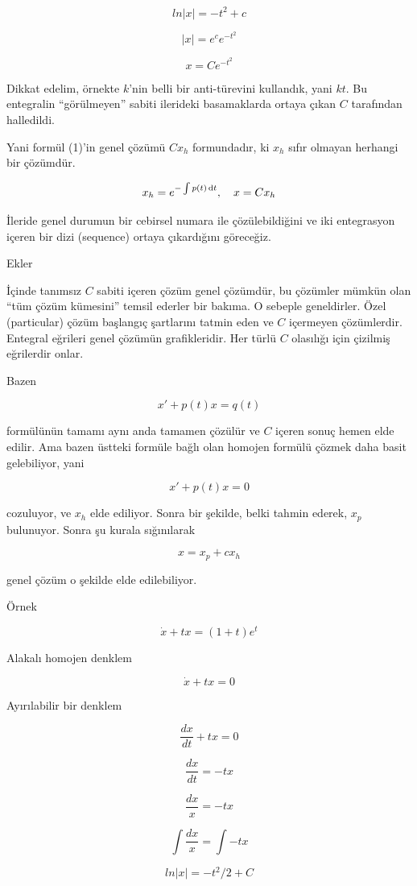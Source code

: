 \documentclass[12pt,fleqn]{article}\usepackage{../../common}
\begin{document}
$$ ln|x| = - t^2 + c $$

$$ |x| = e^c e^{-t^2} $$

$$ x = C e^{-t^2} $$

Dikkat edelim, örnekte $k$'nin belli bir anti-türevini kullandık, yani
$kt$. Bu entegralin ``görülmeyen'' sabiti ilerideki basamaklarda ortaya
çıkan $C$ tarafından halledildi.

Yani formül (1)'in genel çözümü $C x_h$ formundadır, ki $x_h$ sıfır olmayan
herhangi bir çözümdür.

$$ x_h = e^{- \int p(t) \,\mathrm{d} t} , \quad x = C x_h $$

İleride genel durumun bir cebirsel numara ile çözülebildiğini ve iki
entegrasyon içeren bir dizi (sequence) ortaya çıkardığını göreceğiz.

Ekler

İçinde tanımsız $C$ sabiti içeren çözüm genel çözümdür, bu çözümler mümkün
olan ``tüm çözüm kümesini'' temsil ederler bir bakıma. O sebeple
geneldirler. Özel (particular) çözüm başlangıç şartlarını tatmin eden ve
$C$ içermeyen çözümlerdir. Entegral eğrileri genel çözümün
grafikleridir. Her türlü $C$ olasılığı için çizilmiş eğrilerdir onlar.

Bazen 

$$ x' + p(t)x = q(t) $$
 
formülünün tamamı aynı anda tamamen çözülür ve $C$ içeren sonuç hemen elde
edilir. Ama bazen üstteki formüle bağlı olan homojen formülü çözmek daha
basit gelebiliyor, yani

$$ x' + p(t)x = 0 $$
 
cozuluyor, ve $x_h$ elde ediliyor. Sonra bir şekilde, belki tahmin ederek,
$x_p$ bulunuyor. Sonra şu kurala sığınılarak

$$ x = x_p + cx_h $$

genel çözüm o şekilde elde edilebiliyor. 

Örnek

$$ \dot{x} + tx = (1+t)e^t $$

Alakalı homojen denklem 

$$ \dot{x} + tx = 0$$

Ayırılabilir bir denklem

$$ \frac{dx}{dt} + tx = 0 $$

$$ \frac{dx}{dt} = - tx  $$

$$ \frac{dx}{x} = -tx $$

$$ \int \frac{dx}{x} = \int -tx $$

$$ ln |x| = -t^2 / 2 + C $$
\end{document}
